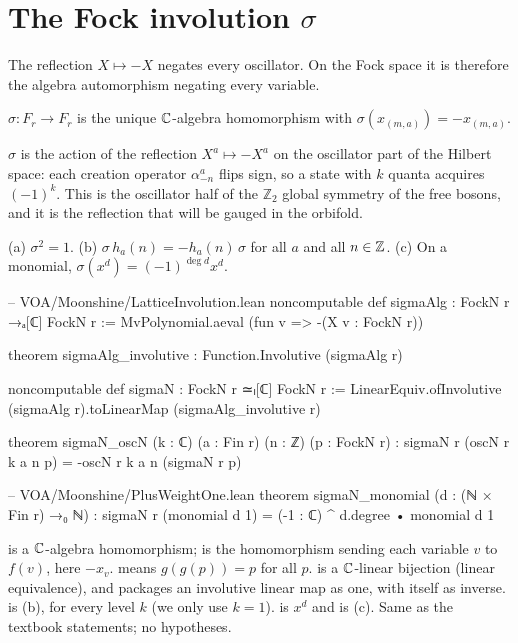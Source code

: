\section{The Fock involution \texorpdfstring{$\sigma$}{sigma}}\label{ch04:sec:sigma}

The reflection $X\mapsto-X$ negates every oscillator. On the Fock space it is therefore the
algebra automorphism negating every variable.

\begin{definition}\label{ch04:def:sigma}
$\sigma:F_r\to F_r$ is the unique ${\mathbb{C}}$-algebra homomorphism with $\sigma(x_{(m,a)})=-x_{(m,a)}$.
\end{definition}

\begin{physics}
$\sigma$ is the action of the reflection $X^a\mapsto-X^a$ on the oscillator part of the Hilbert space: each creation operator $\alpha^a_{-n}$ flips sign, so a state with $k$ quanta acquires $(-1)^k$. This is the oscillator half of the $\mathbb Z_2$ global symmetry of the free bosons, and it is the reflection that will be gauged in the orbifold.
\end{physics}

\begin{proposition}\label{ch04:prop:sigma}
(a) $\sigma^2=1$. (b) $\sigma\,h_a(n)=-h_a(n)\,\sigma$ for all $a$ and all $n\in{\mathbb{Z}}$.
(c) On a monomial, $\sigma(x^d)=(-1)^{\deg d}x^d$.
\end{proposition}

\begin{leancode}
-- VOA/Moonshine/LatticeInvolution.lean
noncomputable def sigmaAlg : FockN r →ₐ[ℂ] FockN r := MvPolynomial.aeval (fun v => -(X v : FockN r))

theorem sigmaAlg_involutive : Function.Involutive (sigmaAlg r)

noncomputable def sigmaN : FockN r ≃ₗ[ℂ] FockN r :=
  LinearEquiv.ofInvolutive (sigmaAlg r).toLinearMap (sigmaAlg_involutive r)

theorem sigmaN_oscN (k : ℂ) (a : Fin r) (n : ℤ) (p : FockN r) :
    sigmaN r (oscN r k a n p) = -oscN r k a n (sigmaN r p)

-- VOA/Moonshine/PlusWeightOne.lean
theorem sigmaN_monomial (d : (ℕ × Fin r) →₀ ℕ) :
    sigmaN r (monomial d 1) = (-1 : ℂ) ^ d.degree • monomial d 1
\end{leancode}

\begin{dictionary}
 is a ${\mathbb{C}}$-algebra homomorphism;  is the homomorphism
sending each variable $v$ to $f(v)$, here $-x_v$.  means $g(g(p))=p$ for
all $p$.  is a ${\mathbb{C}}$-linear bijection (linear equivalence), and
 packages an involutive linear map as one, with itself as inverse.
 is (b), for every level $k$ (we only use $k=1$).  is $x^d$
and  is (c). Same as the textbook statements; no hypotheses.
\end{dictionary}

